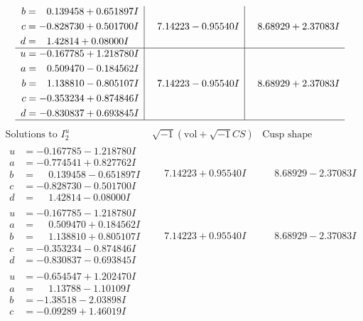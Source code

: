 \documentclass[1p]{elsarticle_modified}
\theoremstyle{definition}
\newcommand{\I}{\sqrt{-1}}
\begin{document}
$$\begin{array}{c|c|c}
\begin{aligned}
b &= \phantom{-}0.139458 + 0.651897 I \\
c &= -0.828730 + 0.501700 I \\
d &= \phantom{-}1.42814 + 0.08000 I\end{aligned}
 & \phantom{-}7.14223 - 0.95540 I & \phantom{-}8.68929 + 2.37083 I \\ \hline\begin{aligned}
u &= -0.167785 + 1.218780 I \\
a &= \phantom{-}0.509470 - 0.184562 I \\
b &= \phantom{-}1.138810 - 0.805107 I \\
c &= -0.353234 + 0.874846 I \\
d &= -0.830837 + 0.693845 I\end{aligned}
 & \phantom{-}7.14223 - 0.95540 I & \phantom{-}8.68929 + 2.37083 I\\
 \hline 
 \end{array}$$\newpage$$\begin{array}{c|c|c}  
\text{Solutions to }I^u_{2}& \I (\text{vol} + \sqrt{-1}CS) & \text{Cusp shape}\\
 \hline 
\begin{aligned}
u &= -0.167785 - 1.218780 I \\
a &= -0.774541 + 0.827762 I \\
b &= \phantom{-}0.139458 - 0.651897 I \\
c &= -0.828730 - 0.501700 I \\
d &= \phantom{-}1.42814 - 0.08000 I\end{aligned}
 & \phantom{-}7.14223 + 0.95540 I & \phantom{-}8.68929 - 2.37083 I \\ \hline\begin{aligned}
u &= -0.167785 - 1.218780 I \\
a &= \phantom{-}0.509470 + 0.184562 I \\
b &= \phantom{-}1.138810 + 0.805107 I \\
c &= -0.353234 - 0.874846 I \\
d &= -0.830837 - 0.693845 I\end{aligned}
 & \phantom{-}7.14223 + 0.95540 I & \phantom{-}8.68929 - 2.37083 I \\ \hline\begin{aligned}
u &= -0.654547 + 1.202470 I \\
a &= \phantom{-}1.13788 - 1.10109 I \\
b &= -1.38518 - 2.03898 I \\
c &= -0.09289 + 1.46019 I \\

\end{aligned}
\end{array}$$
\end{document}
